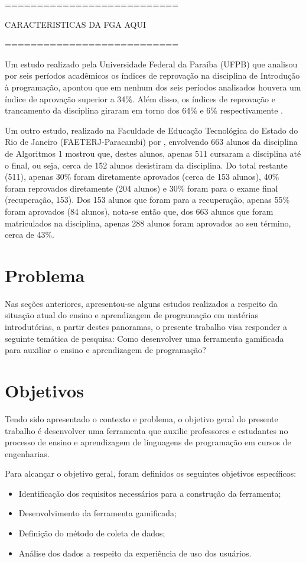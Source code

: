 ===========================

CARACTERISTICAS DA FGA AQUI

===========================

Um estudo realizado pela Universidade Federal da Paraíba (UFPB) que analisou por seis períodos 
acadêmicos os índices de reprovação na disciplina de Introdução à programação, apontou que 
em nenhum dos seis períodos analisados houvera um índice de aprovação superior a 34\%. Além disso,
os índices de reprovação e trancamento da disciplina giraram em torno dos 64\% e 6\% respectivamente \cite{SBIE6739}.

Um outro estudo, realizado na Faculdade de Educação Tecnológica do Estado do Rio de Janeiro (FAETERJ-Paracambi) por , 
envolvendo 663 alunos da disciplina de Algoritmos 1 mostrou que, destes alunos, apenas 511 cursaram a disciplina 
até o final, ou seja, cerca de 152 alunos desistiram da disciplina. Do total restante (511), apenas 30\% foram
diretamente aprovados (cerca de 153 alunos), 40\% foram reprovados diretamente (204 alunos) e 30\% foram para o exame final (recuperação, 153).
Dos 153 alunos que foram para a recuperação, apenas 55\% foram aprovados (84 alunos), nota-se então que, dos 663 alunos que
foram matriculados na disciplina, apenas  288 alunos foram aprovados ao seu término, cerca de 43\%.

\section{Problema}
Nas seções anteriores, apresentou-se alguns estudos realizados a respeito da situação atual do ensino e aprendizagem
de programação em matérias introdutórias, a partir destes panoramas, o presente trabalho visa responder a seguinte temática
de pesquisa:
Como desenvolver uma ferramenta gamificada para auxiliar o ensino e aprendizagem de programação?
 
\section{Objetivos}
Tendo sido apresentado o contexto e problema, o objetivo geral do presente trabalho é
desenvolver uma ferramenta que auxilie professores e estudantes no processo de ensino e aprendizagem
de linguagens de programação em cursos de engenharias. 

Para alcançar o objetivo geral, foram definidos os seguintes objetivos específicos:
\begin{itemize}
	\item Identificação dos requisitos necessários para a construção da ferramenta;
	\item Desenvolvimento da ferramenta gamificada;
	\item Definição do método de coleta de dados;
	\item Análise dos dados a respeito da experiência de uso dos usuários.
\end{itemize}


